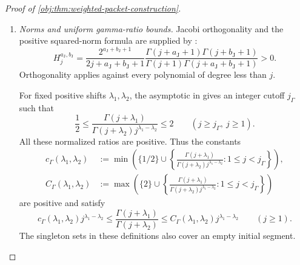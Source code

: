 \documentclass[11pt]{article}
\begin{document}
\begin{proof}[Proof of \cref{obj:thm:weighted-packet-construction}]
\begin{enumerate}
\[\begin{split}
&\qquad\le
\frac{C_{\mathrm{lip},\tau}^{a_{\mathrm J},b_{\mathrm J}}m^2
      \delta_{\mathrm{ang}}(z_1,\xi)}
{\sqrt{\mathcal W_{a_{\mathrm J},b_{\mathrm J}}(m;z_2)
       \mathcal W_{a_{\mathrm J},b_{\mathrm J}}(m;\zeta)}
 (1+m\delta_{\mathrm{ang}}(z_2,\zeta))^\tau},
\end{split}
\]
whenever \(z_1,z_2,\xi,\zeta\in[-1,1]\) and
\[
\delta_{\mathrm{ang}}(z_1,\xi)\le m^{-1},
\qquad
\delta_{\mathrm{ang}}(\zeta,\xi)\le m^{-1}.
\]
The parameter and filter hypotheses hold for both Jacobi systems used below.

\item \emph{Norms and uniform gamma-ratio bounds.}
Jacobi orthogonality and the positive squared-norm formula are supplied by
\citep[Table~18.3.1, Jacobi row and caption]{https://dlmf.nist.gov/18.3}:
\[
H_j^{a_{\mathrm J},b_{\mathrm J}}
=
\frac{2^{a_{\mathrm J}+b_{\mathrm J}+1}}
     {2j+a_{\mathrm J}+b_{\mathrm J}+1}
\frac{\Gamma(j+a_{\mathrm J}+1)\Gamma(j+b_{\mathrm J}+1)}
     {\Gamma(j+1)\Gamma(j+a_{\mathrm J}+b_{\mathrm J}+1)}
>0.
\]
Orthogonality applies against every polynomial of degree less than \(j\).

For fixed positive shifts \(\lambda_1,\lambda_2\), the asymptotic in
\citep[Equation~5.11.12]{https://dlmf.nist.gov/5.11.E12}
gives an integer cutoff \(j_\Gamma\) such that
\[
\frac12
\le
\frac{\Gamma(j+\lambda_1)}
     {\Gamma(j+\lambda_2)j^{\lambda_1-\lambda_2}}
\le2
\qquad(j\ge j_\Gamma,\ j\ge1).
\]
All these normalized ratios are positive. Thus the constants
\[
\begin{split}
c_\Gamma(\lambda_1,\lambda_2)
&:=
\min\left(
\{1/2\}\cup
\left\{
\frac{\Gamma(j+\lambda_1)}
     {\Gamma(j+\lambda_2)j^{\lambda_1-\lambda_2}}
:1\le j<j_\Gamma
\right\}\right),\\
C_\Gamma(\lambda_1,\lambda_2)
&:=
\max\left(
\{2\}\cup
\left\{
\frac{\Gamma(j+\lambda_1)}
     {\Gamma(j+\lambda_2)j^{\lambda_1-\lambda_2}}
:1\le j<j_\Gamma
\right\}\right)
\end{split}
\]
are positive and satisfy
\[
c_\Gamma(\lambda_1,\lambda_2)j^{\lambda_1-\lambda_2}
\le
\frac{\Gamma(j+\lambda_1)}{\Gamma(j+\lambda_2)}
\le
C_\Gamma(\lambda_1,\lambda_2)j^{\lambda_1-\lambda_2}
\qquad(j\ge1).
\]
The singleton sets in these definitions also cover an empty initial segment.


\end{enumerate}
\end{proof}
\end{document}
